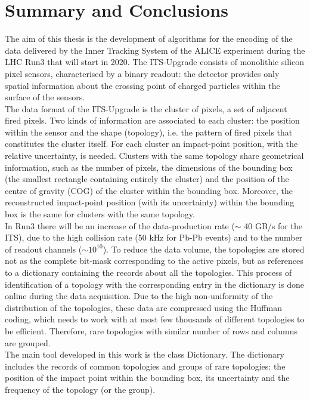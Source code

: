 \chapter{Summary and Conclusions}
The aim of this thesis is the development of algorithms for the encoding of the data delivered by the Inner Tracking System of the ALICE experiment during the LHC Run3 that will start in 2020. The ITS-Upgrade consists of monolithic silicon pixel sensors, characterised by a binary readout: the detector provides only spatial information about the crossing point of charged particles within the surface of the sensors.\\
The data format of the ITS-Upgrade is the cluster of pixels, a set of adjacent fired pixels. Two kinds of information are associated to each cluster: the position within the sensor and the shape (topology), i.e. the pattern of fired pixels that constitutes the cluster itself. For each cluster an impact-point position, with the relative uncertainty, is needed. Clusters with the same topology share geometrical information, such as the number of pixels, the dimensions of the bounding box (the smallest rectangle containing entirely the cluster) and the position of the centre of gravity (COG) of the cluster within the bounding box. Moreover, the reconstructed impact-point position (with its uncertainty) within the bounding box is the same for clusters with the same topology.\\
In Run3 there will be an increase of the data-production rate ($\sim$ 40 GB/s for the ITS), due to the high collision rate (50 kHz for Pb-Pb events) and to the number of readout channels ($\sim 10^{10}$). To reduce the data volume, the topologies are stored not as the complete bit-mask corresponding to the active pixels, but as references to a dictionary containing the records about all the topologies. This process of identification of a topology with the corresponding entry in the dictionary is done online during the data acquisition. Due to the high non-uniformity of the distribution of the topologies, these data are compressed using the Huffman coding, which needs to work with at most few thousands of different topologies to be efficient. Therefore, rare topologies with similar number of rows and columns are grouped.\\
The main tool developed in this work is the class Dictionary. The dictionary includes the records of common topologies and groups of rare topologies: the position of the impact point within the bounding box, its uncertainty and the frequency of the topology (or the group).\\ 
